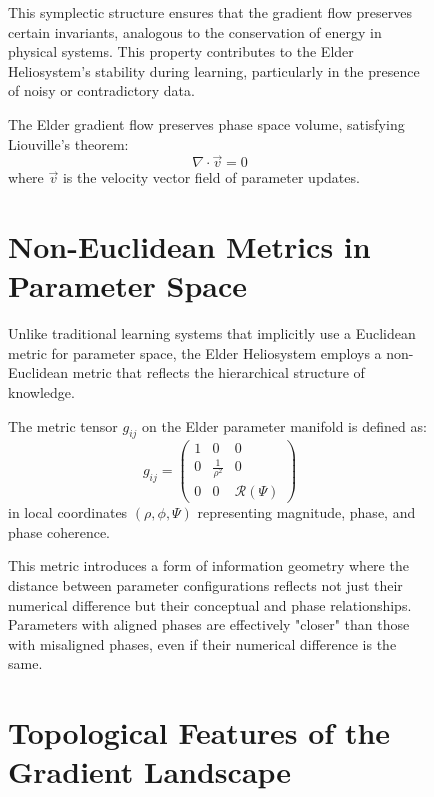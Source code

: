 \begin{figure}[ht]
This symplectic structure ensures that the gradient flow preserves certain invariants, analogous to the conservation of energy in physical systems. This property contributes to the Elder Heliosystem's stability during learning, particularly in the presence of noisy or contradictory data.

\begin{corollary}
The Elder gradient flow preserves phase space volume, satisfying Liouville's theorem:
\begin{equation}
\nabla \cdot \vec{v} = 0
\end{equation}
where $\vec{v}$ is the velocity vector field of parameter updates.
\end{corollary}

\section{Non-Euclidean Metrics in Parameter Space}

Unlike traditional learning systems that implicitly use a Euclidean metric for parameter space, the Elder Heliosystem employs a non-Euclidean metric that reflects the hierarchical structure of knowledge.

\begin{definition}
The metric tensor $g_{ij}$ on the Elder parameter manifold is defined as:
\begin{equation}
g_{ij} = \begin{pmatrix} 
1 & 0 & 0 \\
0 & \frac{1}{\rho^2} & 0 \\
0 & 0 & \mathcal{R}(\Psi)
\end{pmatrix}
\end{equation}
in local coordinates $(\rho, \phi, \Psi)$ representing magnitude, phase, and phase coherence.
\end{definition}

This metric introduces a form of information geometry where the distance between parameter configurations reflects not just their numerical difference but their conceptual and phase relationships. Parameters with aligned phases are effectively "closer" than those with misaligned phases, even if their numerical difference is the same.

\section{Topological Features of the Gradient Landscape}


\end{figure}
